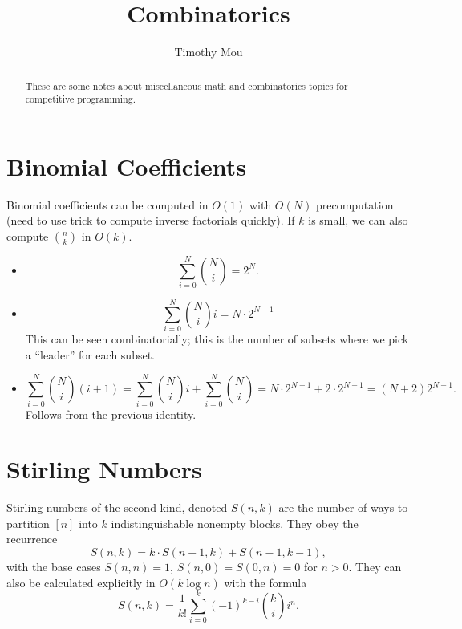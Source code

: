 \documentclass[11pt]{scrartcl}
\begin{document}
\title{Combinatorics}
\author{Timothy Mou}
\maketitle

\tableofcontents

\begin{abstract}
  These are some notes about miscellaneous math and combinatorics topics for competitive programming.
\end{abstract}

\section{Binomial Coefficients}
Binomial coefficients can be computed in $O(1)$ with $O(N)$ precomputation (need to use trick to compute inverse factorials quickly).
If $k$ is small, we can also compute ${n \choose k}$ in $O(k)$.
\begin{itemize}
    \item
      \[
        \sum_{i=0}^N {N \choose i} = 2^N.
      \]
      \item
      \[
        \sum_{i=0}^N {N \choose i} i = N \cdot 2^{N-1}
      \]
      This can be seen combinatorially; this is the number of subsets where we pick a ``leader'' for each subset.
      \item
        \[
          \sum_{i=0}^N {N \choose i} (i+1) = \sum_{i=0}^N {N \choose i} i + \sum_{i=0}^N {N \choose i} = N \cdot 2^{N-1} + 2 \cdot 2^{N-1} = (N + 2) 2^{N-1}.
        \]
        Follows from the previous identity.

\end{itemize}

\newpage
\section{Stirling Numbers}
Stirling numbers of the second kind, denoted $S(n, k)$ are the number of ways to partition $[n]$ into $k$ indistinguishable nonempty blocks.
They obey the recurrence
\[
  S(n, k) = k \cdot S(n-1, k) + S(n-1, k-1),
\]
with the base cases $S(n, n) = 1$, $S(n, 0) = S(0, n) = 0$ for $n > 0$.
They can also be calculated explicitly in $O(k \log n)$ with the formula
\[
  S(n, k) = \frac{1}{k!} \sum_{i=0}^k (-1)^{k-i} {k \choose i} i^n.
\]
\end{document}

